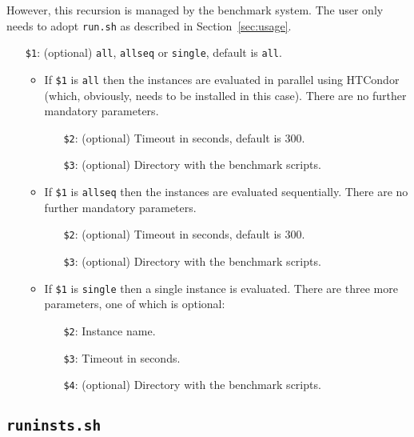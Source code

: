 \documentclass[a4paper]{article}
\begin{document}
		    However, this recursion is managed by the benchmark system.
		    The user only needs to adopt {\tt run.sh} as described in Section~\ref{sec:usage}.
		
		    \medskip{}
		    \begin{itemize}
				\item[{\tt \$1}:] (optional) {\tt all}, {\tt allseq} or {\tt single}, default is {\tt all}.
					\begin {itemize}
						\item If {\tt \$1} is {\tt all} then the instances are evaluated in parallel using HTCondor (which, obviously, needs to be installed in this case). There are no further mandatory parameters.
							\begin{itemize}
								\item[{\tt \$2}:] (optional) Timeout in seconds, default is $300$.
								\item[{\tt \$3}:] (optional) Directory with the benchmark scripts.
							\end{itemize}
						\item If {\tt \$1} is {\tt allseq} then the instances are evaluated sequentially. There are no further mandatory parameters.
							\begin{itemize}
								\item[{\tt \$2}:] (optional) Timeout in seconds, default is $300$.
								\item[{\tt \$3}:] (optional) Directory with the benchmark scripts.
							\end{itemize}
						\item If {\tt \$1} is {\tt single} then a single instance is evaluated. There are three more parameters, one of which is optional:
							\begin{itemize}
								\item[{\tt \$2}:] Instance name.
								\item[{\tt \$3}:] Timeout in seconds.
								\item[{\tt \$4}:] (optional) Directory with the benchmark scripts.
							\end{itemize}
					\end{itemize}
		    \end{itemize}
				
		\subsection{\tt runinsts.sh}
		\label{sec:architecture:runinsts}
		
\end{document}
